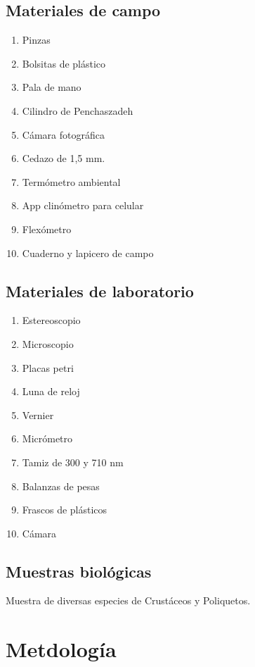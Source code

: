 \documentclass[5p,times,authoryear]{elsarticle}
\begin{document}
\subsection{Materiales de campo}
\begin{enumerate}
\item Pinzas
\item Bolsitas de pl\'astico
\item Pala de mano
\item Cilindro de Penchaszadeh
\item C\'amara fotogr\'afica
\item Cedazo de 1,5 mm.
\item Term\'ometro ambiental
\item App clin\'ometro para celular
\item Flex\'ometro
\item Cuaderno y lapicero de campo
\end{enumerate}
\subsection{Materiales de laboratorio}
\begin{enumerate}
\item Estereoscopio
\item Microscopio
\item Placas petri
\item Luna de reloj
\item Vernier
\item Micr\'ometro
\item Tamiz de 300 y 710 nm
\item Balanzas de pesas
\item Frascos de pl\'asticos
\item C\'amara
\end{enumerate}

\subsection{Muestras biol\'ogicas}
Muestra de diversas especies de Crust\'aceos y Poliquetos.

\section{Metdolog\'ia}
\end{document}
